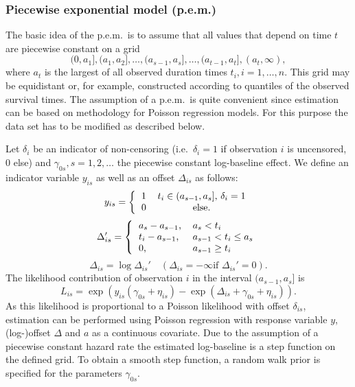 \documentclass[11pt,a4paper,twoside]{bayesxarticle}
\begin{document}
\subsubsection{Piecewise exponential model (p.e.m.)}

The basic idea of the p.e.m.~is to assume that all values that
depend on time $t$ are piecewise constant on a grid
\[
(0,a_1],(a_1,a_2],\ldots,(a_{s-1},a_s],\ldots,(a_{t-1},a_t],(a_t,\infty),
\]
where $a_t$ is the largest of all observed duration times
$t_i,i=1,\ldots,n$. This grid may be equidistant or, for example,
constructed according to quantiles of the observed survival times.
The assumption of a p.e.m.~is quite convenient since estimation can
be based on methodology for Poisson regression models. For this
purpose the data set has to be modified as described below.

Let $\delta_i$ be an indicator of non-censoring (i.e.~$\delta_i=1$
if observation $i$ is uncensored, 0 else) and
$\gamma_{0s},s=1,2,\ldots$ the piecewise constant log-baseline
effect. We define an indicator variable $y_{is}$ as well as an
offset $\Delta_{is}$ as follows:
\[
y_{is}=\left\{
 \begin{tabular}{cc}
1 & $t_i\in (a_{s-1},a_s]$, $\delta_i=1$\\0 & else.
 \end{tabular}
 \right.
\]
\vspace{0.05cm}
\[
\Delta_{is}'=\left\{\begin{tabular}{ll} $a_s-a_{s-1}$,&$a_s<t_i$ \\ $t_i-a_{s-1}$,&$a_{s-1}<t_i\le a_s$ \\
0, &$a_{s-1}\ge t_i$
\end{tabular}\right.
\]
\[
\Delta_{is}=\log{\Delta_{is}'} \quad (\Delta_{is}=-\infty \textrm{
if } \Delta_{is}'=0).
\]
The likelihood contribution of observation $i$ in the interval
$(a_{s-1},a_s]$ is
\[
L_{is}=\exp\left(y_{is}(\gamma_{0s}+\eta_{is})-\exp(\Delta_{is}+\gamma_{0s}+\eta_{is})\right).
\]
As this likelihood is proportional to a Poisson likelihood with
offset $\delta_{is}$, estimation can be performed using Poisson
regression with response variable $y$, (log-)offset $\Delta$ and $a$
as a continuous covariate. Due to the assumption of a piecewise
constant hazard rate the estimated log-baseline is a step function
on the defined grid. To obtain a smooth step function, a random walk
prior is specified for the parameters $\gamma_{0s}$.
\end{document}
